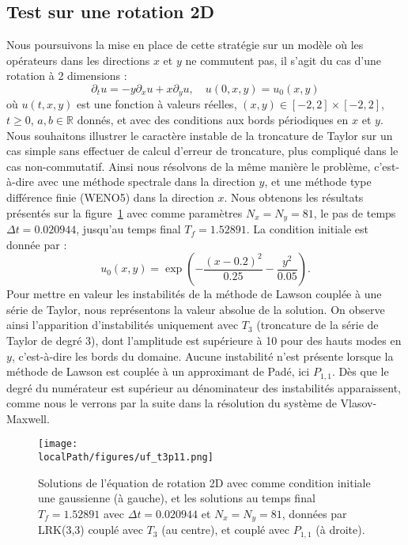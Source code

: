 \subsection{Test sur une rotation 2D}

Nous poursuivons la mise en place de cette stratégie sur un modèle où les opérateurs dans les directions $x$ et $y$ ne commutent pas, il s'agit du cas d'une rotation à 2 dimensions :
$$
  \partial_t u = -y\partial_x u + x\partial_y u,\quad u(0,x,y)=u_0(x,y)
$$
où $u(t,x,y)$ est une fonction à valeurs réelles, $(x,y)\in[-2,2]\times[-2,2]$, $t\geq0$, $a,b\in\mathbb{R}$ donnés, et avec des conditions aux bords périodiques en $x$ et $y$. Nous souhaitons illustrer le caractère instable de la troncature de Taylor sur un cas simple sans effectuer de calcul d'erreur de troncature, plus compliqué dans le cas non-commutatif. Ainsi nous résolvons de la même manière le problème, c'est-à-dire avec une méthode spectrale dans la direction $y$, et une méthode type différence finie (WENO5) dans la direction $x$. Nous obtenons les résultats présentés sur la figure~\ref{fig:uft3p11} avec comme paramètres $N_x=N_y=81$, le pas de temps $\Delta t=0.020944$, jusqu'au temps final $T_f=1.52891$. La condition initiale est donnée par :
$$
  u_0(x,y) = \exp( -\frac{(x-0.2)^2}{0.25} - \frac{y^2}{0.05} ).
$$
Pour mettre en valeur les instabilités de la méthode de Lawson couplée à une série de Taylor, nous représentons la valeur absolue de la solution. On observe ainsi l'apparition d'instabilités uniquement avec $T_3$ (troncature de la série de Taylor de degré 3), dont l'amplitude est supérieure à 10 pour des hauts modes en $y$, c'est-à-dire les bords du domaine. Aucune instabilité n'est présente lorsque la méthode de Lawson est couplée à un approximant de Padé, ici $P_{1,1}$. Dès que le degré du numérateur est supérieur au dénominateur des instabilités apparaissent, comme nous le verrons par la suite dans la résolution du système de Vlasov-Maxwell.

\begin{figure}
  \centering
  \texttt{[image: \\localPath/figures/uf\_t3p11.png]}
    \caption{Solutions de l'équation de rotation 2D avec comme condition initiale une gaussienne (à gauche), et les solutions au temps final $T_f=1.52891$ avec $\Delta t=0.020944$ et $N_x=N_y=81$, données par LRK(3,3) couplé avec $T_3$ (au centre), et couplé avec $P_{1,1}$ (à droite).}
    \label{fig:uft3p11}
\end{figure}

